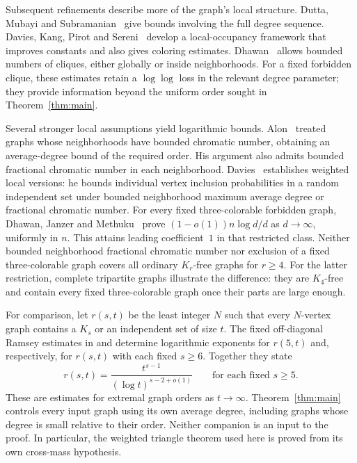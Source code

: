 \documentclass[11pt]{article}
\theoremstyle{definition}
\theoremstyle{remark}
\numberwithin{equation}{section}
\begin{document}
Subsequent refinements describe more of the graph's local structure.
Dutta, Mubayi and Subramanian~\cite{DMS2012} give bounds involving
the full degree sequence. Davies, Kang, Pirot and
Sereni~\cite[Theorem~30 and Corollary~31]{DKPS2020} develop a local-occupancy
framework that improves constants and also gives coloring estimates.
Dhawan~\cite[Theorems~1.3 and~1.4]{DhawanLocallySparse2026} allows bounded
numbers of cliques, either globally or inside neighborhoods.
For a fixed forbidden clique, these estimates retain a $\log\log$
loss in the relevant degree parameter; they provide information beyond
the uniform order sought in Theorem~\ref{thm:main}.

Several stronger local assumptions yield logarithmic bounds.
Alon~\cite[Theorem~1.1 and the remark following its proof]{Alon1996}
treated graphs whose neighborhoods have
bounded chromatic number, obtaining an average-degree bound of the
required order. His argument also admits bounded fractional chromatic
number in each neighborhood. Davies~\cite[Theorems~1 and~3]{Davies2026}
establishes weighted local versions: he bounds individual vertex
inclusion probabilities in a random independent set under bounded
neighborhood maximum average degree or fractional chromatic number.
For every fixed three-colorable forbidden graph, Dhawan, Janzer and
Methuku~\cite[Theorems~1.4 and~1.6]{DJM2025} prove
$(1-o(1))n\log d/d$ as $d\to\infty$, uniformly in $n$.
This attains leading coefficient~$1$ in that restricted class.
Neither bounded neighborhood fractional chromatic number nor exclusion of a fixed
three-colorable graph covers all ordinary $K_r$-free graphs for $r\ge4$.
For the latter restriction, complete tripartite graphs illustrate the
difference: they are $K_4$-free and contain every fixed three-colorable
graph once their parts are large enough.

For comparison, let $r(s,t)$ be the least integer $N$ such that every
$N$-vertex graph contains a $K_s$ or an independent set of size $t$.
The fixed off-diagonal Ramsey estimates in
\cite[Theorem~1.1]{RamseyFive} and \cite[Theorem~1.1]{RamseyFixed}
determine logarithmic exponents for $r(5,t)$ and, respectively,
for $r(s,t)$ with each fixed $s\ge6$.
Together they state
\[
 r(s,t)=\frac{t^{s-1}}{(\log t)^{s-2+o(1)}}
 \qquad\text{for each fixed }s\ge5.
\]
These are estimates for extremal graph orders as $t\to\infty$.
Theorem~\ref{thm:main} controls every input graph using its own average
degree, including graphs whose degree is small relative to their order.
Neither companion is an input to the proof. In particular, the weighted
triangle theorem used here is proved from its own cross-mass hypothesis.
\end{document}

